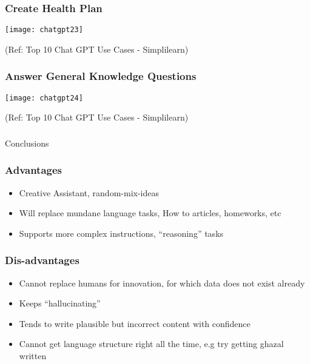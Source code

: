 \begin{frame}[fragile]\frametitle{Create Health Plan}
\begin{center}
\texttt{[image: chatgpt23]}
\end{center}

{\tiny (Ref: Top 10 Chat GPT Use Cases - Simplilearn)}
\end{frame}

\begin{frame}[fragile]\frametitle{Answer General Knowledge Questions}
\begin{center}
\texttt{[image: chatgpt24]}
\end{center}

{\tiny (Ref: Top 10 Chat GPT Use Cases - Simplilearn)}
\end{frame}

\begin{frame}[fragile]\frametitle{}
\begin{center}
{\Large Conclusions}
\end{center}
\end{frame}


\begin{frame}[fragile]\frametitle{Advantages}


\begin{itemize}
\item Creative Assistant, random-mix-ideas
\item Will replace mundane language tasks, How to articles, homeworks, etc
\item Supports more complex instructions, ``reasoning'' tasks
\end{itemize}	 

\end{frame}

\begin{frame}[fragile]\frametitle{Dis-advantages}


\begin{itemize}
\item Cannot replace humans for innovation, for which data does not exist already
\item Keeps ``hallucinating''
\item Tends to write plausible but incorrect content with confidence
\item Cannot get language structure right all the time, e.g try getting ghazal written
\end{itemize}	 

\end{frame}

